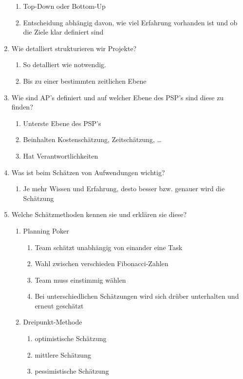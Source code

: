 \documentclass[12pt,a4paper]{article}
\begin{document}
\begin{enumerate}
	\begin{enumerate}
		\item Top-Down oder Bottom-Up
		\item Entscheidung abhängig davon, wie viel Erfahrung vorhanden ist und ob die Ziele klar definiert sind
	\end{enumerate}
	\item Wie detalliert strukturieren wir Projekte?
	\begin{enumerate}
		\item So detalliert wie notwendig.
		\item Bis zu einer bestimmten zeitlichen Ebene
	\end{enumerate}
	\item Wie sind AP's definiert und auf welcher Ebene des PSP's sind diese zu finden?
	\begin{enumerate}
		\item Unterste Ebene des PSP's
		\item Beinhalten Kostenschätzung, Zeitschätzung, \dots
		\item Hat Verantwortlichkeiten
	\end{enumerate}
	\item Was ist beim Schätzen von Aufwendungen wichtig?
	\begin{enumerate}
		\item Je mehr Wissen und Erfahrung, desto besser bzw. genauer wird die Schätzung
	\end{enumerate}
	\item Welche Schätzmethoden kennen sie und erklären sie diese?
	\begin{enumerate}
		\item Planning Poker
		\begin{enumerate}
			\item Team schätzt unabhängig von einander eine Task
			\item Wahl zwischen verschieden Fibonacci-Zahlen
			\item Team muss einstimmig wählen
			\item Bei unterschiedlichen Schätzungen wird sich drüber unterhalten und erneut geschätzt
		\end{enumerate}
		\item Dreipunkt-Methode
		\begin{enumerate}
			\item optimistische Schätzung
			\item mittlere Schätzung
			\item pessimistische Schätzung

\end{enumerate}
\end{enumerate}
\end{enumerate}
\end{document}
